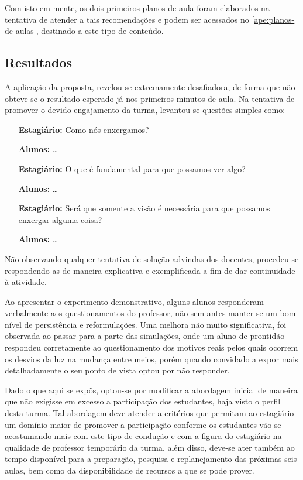 Com isto em mente, os dois primeiros planos de aula foram elaborados na tentativa de atender a tais recomendações e podem ser acessados no \autoref{ape:planos-de-aulas}, destinado a este tipo de conteúdo.

\subsection{Resultados}
A aplicação da proposta, revelou-se extremamente desafiadora, de forma que não obteve-se o resultado esperado já nos primeiros minutos de aula. Na tentativa de promover o devido engajamento da turma, levantou-se questões simples como:

\begin{center}
    \begin{minipage}{.7\textwidth}
        \begin{itemize}
            \item[\textbf{Estagiário:}] Como nós enxergamos?
            \item[\textbf{Alunos:}] \ldots
            \item[\textbf{Estagiário:}] O que é fundamental para que possamos ver algo?
            \item[\textbf{Alunos:}] \ldots
            \item[\textbf{Estagiário:}] Será que somente a visão é necessária para que possamos enxergar alguma coisa?    \item[\textbf{Alunos:}] \ldots      
        \end{itemize}
    \end{minipage}
\end{center}

Não observando qualquer tentativa de solução advindas dos docentes, procedeu-se respondendo-as de maneira explicativa e exemplificada a fim de dar continuidade à atividade.

 Ao apresentar o experimento demonstrativo, alguns alunos responderam verbalmente aos questionamentos do professor, não sem antes manter-se um bom nível de persistência e reformulações. Uma melhora não muito significativa, foi observada ao passar para a parte das simulações, onde um aluno de prontidão respondeu corretamente ao questionamento dos motivos reais pelos quais ocorrem os desvios da luz na mudança entre meios, porém quando convidado a expor mais detalhadamente o seu ponto de vista optou por não responder.

 Dado o que aqui se expôs, optou-se por modificar a abordagem inicial de maneira que não exigisse em excesso a participação dos estudantes, haja visto o perfil desta turma. Tal abordagem deve atender a critérios que permitam ao estagiário um domínio maior de promover a participação conforme os estudantes vão se acostumando mais com este tipo de condução e com a figura do estagiário na qualidade de professor temporário da turma, além disso, deve-se ater também ao tempo disponível para a preparação, pesquisa e replanejamento das próximas seis aulas, bem como da disponibilidade de recursos a que se pode prover.

